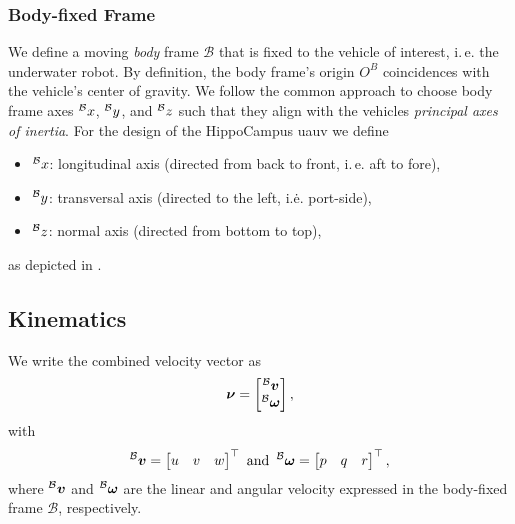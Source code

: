 \subsubsection{Body-fixed Frame}
We define a moving \textit{body} frame $\mathcal{B}$ that is fixed to the vehicle of interest, i.\,e. the underwater robot.
By definition, the body frame's origin ${O}^{B}$ coincidences with the vehicle's center of gravity.%
We follow the common approach to choose body frame axes $\prescript{\mathcal{B}}{}{x}$, $\prescript{\mathcal{B}}{}{y}$, and $\prescript{\mathcal{B}}{}{z}$ such that they align with the vehicles \textit{principal axes of inertia}. 
For the design of the HippoCampus \ac{uauv} we define
\begin{itemize}
    \item $\prescript{\mathcal{B}}{}{x}$: longitudinal axis (directed from back to front, i.\,e. aft to fore),
    \item $\prescript{\mathcal{B}}{}{y}$: transversal axis (directed to the left, i.\.e. port-side),
    \item $\prescript{\mathcal{B}}{}{z}$: normal axis (directed from bottom to top),
\end{itemize}
as depicted in .


\subsection{Kinematics}

We write the combined velocity vector \nub as
\begin{equation}
	\mbox{$\bm{\nu}$} = 
	\begin{bmatrix}
		\prescript{\mathcal{B}}{}{\mbox{$\bm{v}$}} \\
		\prescript{\mathcal{B}}{}{\mbox{$\bm{\omega}$}}
	\end{bmatrix}
	,
\end{equation}
with 
\begin{equation}
	\label{eq:velocities-in-body-frame}
	\prescript{\mathcal{B}}{}{\mbox{$\bm{v}$}} = 
	\begin{bmatrix}
		u & v & w
	\end{bmatrix}^\top
	\text{ and }
	\prescript{\mathcal{B}}{}{\mbox{$\bm{\omega}$}} = 
	\begin{bmatrix}
		p & q & r
	\end{bmatrix}^\top
	,
\end{equation}
where $\prescript{\mathcal{B}}{}{\mbox{$\bm{v}$}}$ and $\prescript{\mathcal{B}}{}{\mbox{$\bm{\omega}$}}$ are the linear and angular velocity expressed in the body-fixed frame $\mathcal{B}$, respectively.

